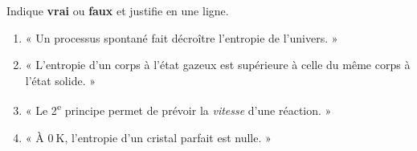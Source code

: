 \documentclass[11pt,a4paper]{article}
\begin{document}
\begin{exo}
Indique \textbf{vrai} ou \textbf{faux} et justifie en une ligne.
\begin{enumerate}[label=\alph*)]
  \item « Un processus spontané fait décroître l'entropie de l'univers. »
  \item « L'entropie d'un corps à l'état gazeux est supérieure à celle du même corps à l'état solide. »
  \item « Le 2\textsuperscript{e} principe permet de prévoir la \emph{vitesse} d'une réaction. »
  \item « À $\qty{0}{\kelvin}$, l'entropie d'un cristal parfait est nulle. »
\end{enumerate}
\end{exo}
\end{document}
